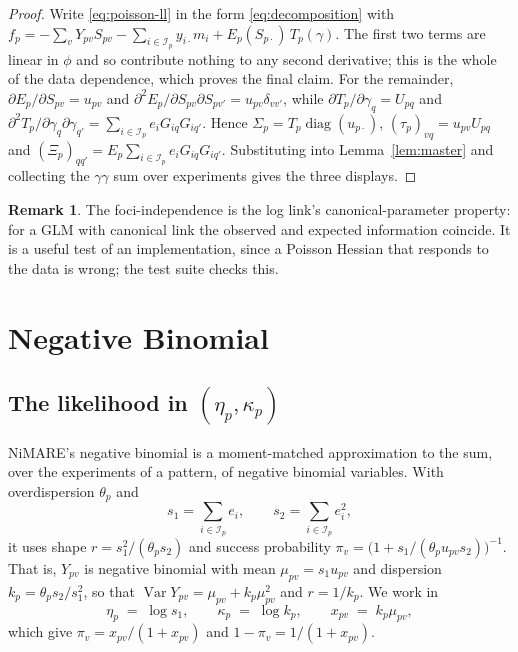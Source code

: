 \documentclass[11pt,a4paper]{article}
\theoremstyle{plain}
\theoremstyle{definition}
\newtheorem{remark}[proposition]{Remark}
\newcommand{\E}{\mathcal{I}}
\newcommand{\diag}{\operatorname{diag}}
\begin{document}
\begin{proof}
Write \eqref{eq:poisson-ll} in the form \eqref{eq:decomposition} with
$f_p = -\sum_v Y_{pv}S_{pv} - \sum_{i\in\E_p} y_{i\cdot}m_i + E_p(S_{p\cdot})\,T_p(\gamma)$.
The first two terms are linear in $\phi$ and so contribute nothing to any second derivative;
this is the whole of the data dependence, which proves the final claim. For the remainder,
$\partial E_p/\partial S_{pv} = u_{pv}$ and $\partial^2 E_p/\partial S_{pv}\partial S_{pv'} =
u_{pv}\delta_{vv'}$, while $\partial T_p/\partial\gamma_q = U_{pq}$ and
$\partial^2 T_p / \partial\gamma_q\partial\gamma_{q'} = \sum_{i\in\E_p} e_i G_{iq}G_{iq'}$.
Hence $\Sigma_p = T_p \diag(u_{p\cdot})$, $(\tau_p)_{vq} = u_{pv}U_{pq}$ and
$(\Xi_p)_{qq'} = E_p \sum_{i \in \E_p} e_iG_{iq}G_{iq'}$. Substituting into
Lemma~\ref{lem:master} and collecting the $\gamma\gamma$ sum over experiments gives the three
displays.
\end{proof}

\begin{remark}
The foci-independence is the log link's canonical-parameter property: for a GLM with canonical
link the observed and expected information coincide. It is a useful test of an implementation,
since a Poisson Hessian that responds to the data is wrong; the test suite checks this.
\end{remark}

\section{Negative Binomial}

\subsection{The likelihood in $(\eta_p, \kappa_p)$}

NiMARE's negative binomial is a moment-matched approximation to the sum, over the experiments of
a pattern, of negative binomial variables. With overdispersion $\theta_p$ and
\begin{equation}
  s_{1} = \sum_{i\in\E_p} e_i, \qquad s_{2} = \sum_{i\in\E_p} e_i^2 ,
\end{equation}
it uses shape $r = s_1^2/(\theta_p s_2)$ and success probability
$\pi_v = \bigl(1 + s_1/(\theta_p u_{pv} s_2)\bigr)^{-1}$. That is, $Y_{pv}$ is negative binomial
with mean $\mu_{pv} = s_1 u_{pv}$ and dispersion $k_p = \theta_p s_2/s_1^2$, so that
$\operatorname{Var} Y_{pv} = \mu_{pv} + k_p\mu_{pv}^2$ and $r = 1/k_p$. We work in
\begin{equation}\label{eq:nb-mk}
  \eta_p \;=\; \log s_1, \qquad \kappa_p \;=\; \log k_p, \qquad x_{pv} \;=\; k_p\mu_{pv},
\end{equation}
which give $\pi_v = x_{pv}/(1+x_{pv})$ and $1-\pi_v = 1/(1+x_{pv})$.
\end{document}
